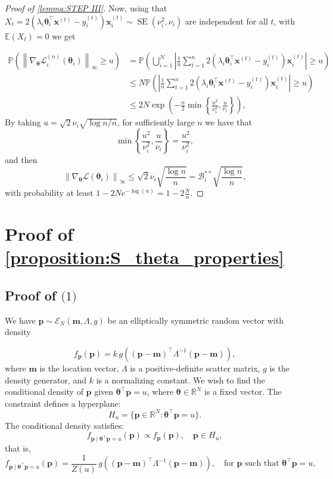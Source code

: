 \documentclass{article} %
\begin{document}
\begin{proof}[Proof of \cref{lemma:STEP III}]
Now, using that $X_t = 2 (\lambda_i\boldsymbol{\theta}_i^{\top} \mathbf{x}^{(t)}-y_i^{(t)} ) \mathbf{x}_{i}^{(t)} \sim \operatorname{SE}(\nu_i^2,\nu_i)$ are independent for all $t$, with $\mathbb{E}(X_t)=0$ we get

$$
\begin{aligned}
\mathbb{P}\left(\left\|\nabla_{\boldsymbol{\theta}} \mathscr{L}_{i}^{(n)}\left(\boldsymbol{\theta}_i\right)\right\|_{\infty} \geq u\right) & = \mathbb{P}\left( \bigcup_{i=1}^{N} \left| \frac{1}{n} \sum_{t=1}^n 2 (\lambda_i\boldsymbol{\theta}_i^{\top} \mathbf{x}^{(t)}-y_i^{(t)} ) \mathbf{x}_{i}^{(t)} \right| \geq u\right)\\
&\leq N\mathbb{P}\left(\left| \frac{1}{n} \sum_{t =1}^n 2 (\lambda_i \boldsymbol{\theta}_i^{\top} \mathbf{x}^{(t)}-y_i^{(t)}) \mathbf{x}_{i}^{(t)} \right| \geq u\right)\\
&\leq 2N \exp \left(-\frac{n}{2}\min \left\{\frac{u^2}{\nu_i^2}, \frac{u}{\nu_i}\right\}\right),
\end{aligned}
$$
By taking $u=\sqrt{2} \nu_i \sqrt{\log n / n}$, for sufficiently large $n$ we have that 
$$
\min \left\{\frac{u^2}{\nu_i^2}, \frac{u}{\nu_i}\right\} = \frac{u^2}{\nu_i^2},
$$
and then
$$
\left\|\nabla_{\boldsymbol{\theta}} \mathscr{L}\left(\boldsymbol{\theta}_i\right)\right\|_{\infty} \leq \sqrt{2} \nu_i \sqrt{\frac{\log n}{n}}= \mathscr{B}_i^{**} \sqrt{\frac{\log n}{n}},
$$
with probability at least $1-2Ne^{-\log (n)}=1-2\tfrac{N}{n}$.
\end{proof}
\newpage

\section{Proof of \cref{proposition:S_theta_properties}}\label{app:S_theta_properties}
\subsection{Proof of $\textit{(1)}$}
We have $\mathbf{p}\sim \mathscr{E}_N(\mathbf{m},\Lambda,g)$ be an elliptically symmetric random vector with density

\[
f_\mathbf{p}(\mathbf{p}) = k\,g((\mathbf{p}-\mathbf{m})^{\top}\Lambda^{-1}(\mathbf{p}-\mathbf{m})),
\]
where $\mathbf{m}$ is the location vector, $\Lambda$ is a positive‐definite scatter matrix, $g$ is the density generator, and $k$ is a normalizing constant. We wish to find the conditional density of $\mathbf{p}$ given $\boldsymbol{\theta}^{\top} \mathbf{p} = u$, where $\boldsymbol{\theta}\in \mathbb{R}^N$ is a fixed vector. The constraint defines a hyperplane:
$$
H_u = \{ \mathbf{p} \in \mathbb{R}^N : \boldsymbol{\theta}^{\top} \mathbf{p} = u\}.
$$
The conditional density satisfies:
$$
f_{\mathbf{p}\mid \boldsymbol{\theta}^{\top} \mathbf{p}=u}(\mathbf{p}) \propto f_{\mathbf{p}}(\mathbf{p}), \quad \mathbf{p}\in H_u,
$$
that is,
$$
f_{\mathbf{p}\mid \boldsymbol{\theta}^{\top} \mathbf{p}=u}(\mathbf{p}) = \frac{1}{Z(u)}\,g((\mathbf{p}-\mathbf{m})^{\top}\Lambda^{-1}(\mathbf{p}-\mathbf{m})), \quad \text{for } \mathbf{p} \text{ such that } \boldsymbol{\theta}^{\top}\mathbf{p}=u,
$$
\end{document}
